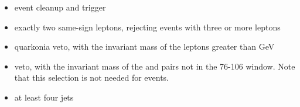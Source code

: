 \begin{itemize}
    \item event cleanup and trigger
    \item exactly two same-sign leptons, rejecting events with three or more
        leptons
    \item quarkonia veto, with the invariant mass of the leptons greater
        than \unit[20]{GeV}
    \item \Z veto, with the invariant mass of the \E\E and \M\M pairs not in
        the 76-106 window. Note that this selection is not needed for \E\M
        events.
    \item at least four jets
\end{itemize}

